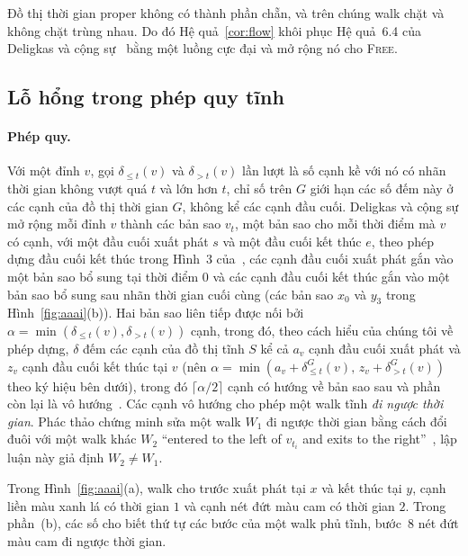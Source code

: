 \documentclass[pdflatex,sn-mathphys-num]{sn-jnl}
\theoremstyle{thmstyleone}
\theoremstyle{thmstyletwo}
\theoremstyle{thmstylethree}
\newcommand{\FREE}{\textup{\textsc{Free}}}
\begin{document}
Đồ thị thời gian proper không có thành phần chẵn, và trên chúng walk chặt và không chặt trùng nhau. Do đó Hệ quả~\ref{cor:flow} khôi phục Hệ quả~6.4 của Deligkas và cộng sự~\cite{deligkas2025} bằng một luồng cực đại và mở rộng nó cho \FREE{}.

\subsection{Lỗ hổng trong phép quy tĩnh}\label{sec:counterexample}

\paragraph{Phép quy.} Với một đỉnh $v$, gọi $\delta_{\le t}(v)$ và $\delta_{>t}(v)$ lần lượt là số cạnh kề với nó có nhãn thời gian không vượt quá $t$ và lớn hơn $t$, chỉ số trên $G$ giới hạn các số đếm này ở các cạnh của đồ thị thời gian $G$, không kể các cạnh đầu cuối. Deligkas và cộng sự mở rộng mỗi đỉnh $v$ thành các bản sao $v_t$, một bản sao cho mỗi thời điểm mà $v$ có cạnh, với một đầu cuối xuất phát $s$ và một đầu cuối kết thúc $e$, theo phép dựng đầu cuối kết thúc trong Hình~3 của~\cite{deligkas2025}, các cạnh đầu cuối xuất phát gắn vào một bản sao bổ sung tại thời điểm $0$ và các cạnh đầu cuối kết thúc gắn vào một bản sao bổ sung sau nhãn thời gian cuối cùng (các bản sao $x_0$ và $y_3$ trong Hình~\ref{fig:aaai}(b)). Hai bản sao liên tiếp được nối bởi $\alpha=\min(\delta_{\le t}(v),\delta_{>t}(v))$ cạnh, trong đó, theo cách hiểu của chúng tôi về phép dựng, $\delta$ đếm các cạnh của đồ thị tĩnh $S$ kể cả $a_v$ cạnh đầu cuối xuất phát và $z_v$ cạnh đầu cuối kết thúc tại $v$ (nên $\alpha=\min(a_v+\delta^G_{\le t}(v),\,z_v+\delta^G_{>t}(v))$ theo ký hiệu bên dưới), trong đó $\lceil\alpha/2\rceil$ cạnh có hướng về bản sao sau và phần còn lại là vô hướng~\cite[p.~26503]{deligkas2025}. Các cạnh vô hướng cho phép một walk tĩnh \emph{đi ngược thời gian}. Phác thảo chứng minh sửa một walk $W_1$ đi ngược thời gian bằng cách đổi đuôi với một walk khác $W_2$ ``entered to the left of $v_{t_i}$ and exits to the right''~\cite[p.~26503]{deligkas2025}, lập luận này giả định $W_2\ne W_1$.

Trong Hình~\ref{fig:aaai}(a), walk cho trước xuất phát tại $x$ và kết thúc tại $y$, cạnh liền màu xanh lá có thời gian $1$ và cạnh nét đứt màu cam có thời gian $2$. Trong phần~(b), các số cho biết thứ tự các bước của một walk phủ tĩnh, bước~8 nét đứt màu cam đi ngược thời gian.
\end{document}
